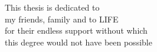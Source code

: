 \begin{dedication}
This thesis is dedicated to\\
 my friends, family and to LIFE\\
for their endless support without which\\
this degree would not have been possible
\end{dedication}